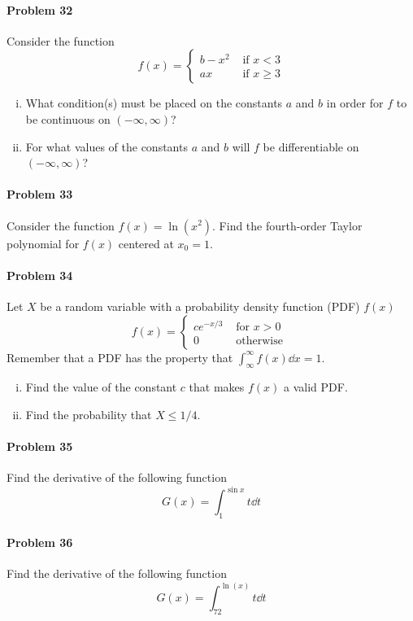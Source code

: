 \documentclass[a4paper, 11pt]{article}
\begin{document}
\paragraph{Problem 32}
Consider the function
\[
	f(x) = \begin{cases}
				b-x^2 & \text{ if } x < 3 \\
				ax & \text{ if } x \geq 3
	 	   \end{cases}
\]
\begin{enumerate}[(i)]
	\item What condition(s) must be placed on the constants $a$ and $b$ in order for $f$ to be continuous on $(-\infty, \infty)$?
	\item For what values of the constants $a$ and $b$ will $f$ be differentiable on $(-\infty, \infty)$?
\end{enumerate}


\paragraph{Problem 33}
Consider the function $f(x) = \ln(x^2)$.
Find the fourth-order Taylor polynomial for $f(x)$ centered at $x_0=1$.


\paragraph{Problem 34}
Let $X$ be a random variable with a probability density function (PDF) $f(x)$
\[
	f(x) = \begin{cases}
 				ce^{-x/3} & \text{ for } x > 0 \\
 				0 & \text{ otherwise }
 		   \end{cases}
\]
Remember that a PDF has the property that $\int_{\infty}^{\infty} f(x)\dd x = 1$.
\begin{enumerate}[(i)]
	\item Find the value of the constant $c$ that makes $f(x)$ a valid PDF.
	\item Find the probability that $X \leq 1/4$.
\end{enumerate}


\paragraph{Problem 35}
Find the derivative of the following function
\[
	G(x) = \int_{1}^{\sin{x}} t \dd t
\]


\paragraph{Problem 36}
Find the derivative of the following function
\[
	G(x) = \int_{72}^{\ln(x)} t \dd t
\]
\end{document}
